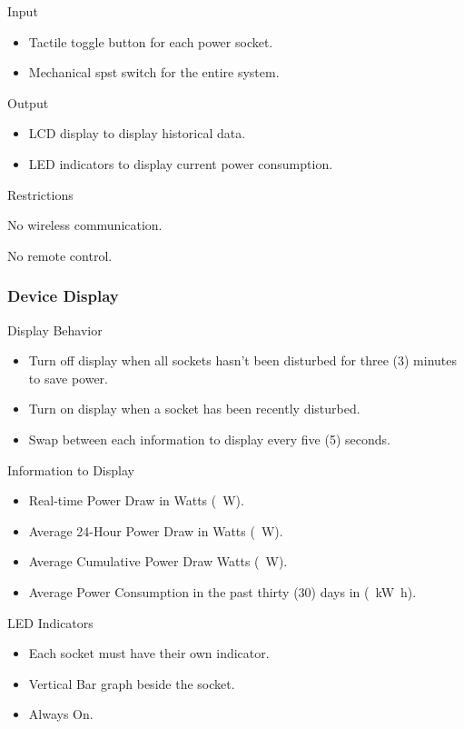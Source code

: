 \documentclass[conference, a4paper]{IEEEtran}
\begin{document}
Input
\begin{itemize}
  \item Tactile toggle button for each power socket.
  \item Mechanical spst switch for the entire system. 
\end{itemize}

Output
\begin{itemize}
  \item LCD display to display historical data.
  \item LED indicators to display current power consumption.
\end{itemize}

Restrictions
\begin{description}
  \item No wireless communication.
  \item No remote control.
\end{description}

\subsubsection{Device Display}
Display Behavior
\begin{itemize}
  \item Turn off display when all sockets hasn’t been disturbed for three (3) minutes to save power.
  \item Turn on display when a socket has been recently disturbed.
  \item Swap between each information to display every five (5) seconds.
\end{itemize}

Information to Display
\begin{itemize}
  \item Real-time Power Draw in Watts (\SI{}{\watt}).
  \item Average 24-Hour Power Draw in Watts (\SI{}{\watt}).
  \item Average Cumulative Power Draw Watts (\SI{}{\watt}).
  \item Average Power Consumption in the past thirty (30) days in (\SI{}{\kilo\watt\hour}).
\end{itemize}

LED Indicators
\begin{itemize}
  \item Each socket must have their own indicator.
  \item Vertical Bar graph beside the socket.
  \item Always On.
\end{itemize}
\end{document}
